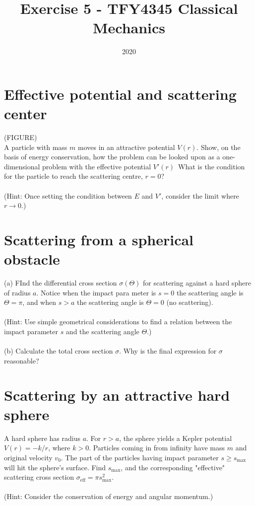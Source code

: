 \documentclass{article}
\title{Exercise 5 - TFY4345 Classical Mechanics}
\date{2020}
\begin{document}
    \maketitle
    \section{Effective potential and scattering center}
        (FIGURE) \\
        A particle with mass $m$ moves in an attractive potential $V(r)$. Show, on the basis of energy conservation, how the problem can be looked upon as a one-dimensional problem with the effective potential $V'(r)$ What is the condition for the particle to reach the scattering centre, $r=0$? \\ \\
    (Hint: Once setting the condition between $E$ and $V'$, consider the limit where $r \rightarrow 0$.)

    \section{Scattering from a spherical obstacle}
        (a) FInd the differential cross section $\sigma(\Theta)$ for scattering against a hard sphere of radius $a$. Notice when the impact para meter is $s = 0$ the scattering angle is $\Theta = \pi$, and when $s > a$ the scattering angle is $\Theta = 0$ (no scattering). \\ \\
        (Hint: Use simple geometrical considerations to find a relation between the impact parameter $s$ and the scattering angle $\Theta$.) \\ \\
        (b) Calculate the total cross section $\sigma$. Why is the final expression for $\sigma$ reasonable?

    \section{Scattering by an attractive hard sphere}
        A hard sphere has radius $a$. For $r > a$, the sphere yields a Kepler potential $V(r) = - k/r$, where $k>0$. Particles coming in from infinity have mass $m$ and original velocity $v_0$. The part of the particles having impact parameter $s \geq s_{\mathrm{max}}$ will hit the sphere's surface. Find $s_{\mathrm{max}}$, and the corresponding "effective" scattering cross section $\sigma_\mathrm{eff} = \pi s_{\mathrm{max}}^2$. \\ \\
        (Hint: Consider the conservation of energy and angular momentum.)
\end{document}
